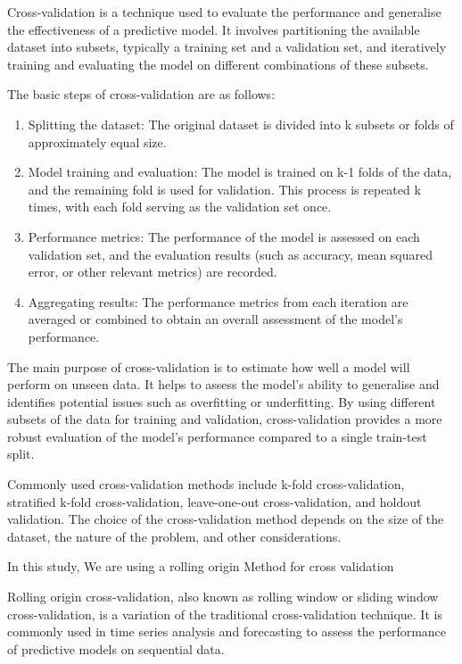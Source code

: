 \documentclass[
]{article}
\begin{document}
Cross-validation is a technique used to evaluate the performance and
generalise the effectiveness of a predictive model. It involves
partitioning the available dataset into subsets, typically a training
set and a validation set, and iteratively training and evaluating the
model on different combinations of these subsets.~

The basic steps of cross-validation are as follows:~

\begin{enumerate}
\def\labelenumi{\arabic{enumi}.}
\item
  Splitting the dataset: The original dataset is divided into k subsets
  or folds of approximately equal size.~
\item
  Model training and evaluation: The model is trained on k-1 folds of
  the data, and the remaining fold is used for validation. This process
  is repeated k times, with each fold serving as the validation set
  once.~
\item
  Performance metrics: The performance of the model is assessed on each
  validation set, and the evaluation results (such as accuracy, mean
  squared error, or other relevant metrics) are recorded.~
\item
  Aggregating results: The performance metrics from each iteration are
  averaged or combined to obtain an overall assessment of the model's
  performance.~
\end{enumerate}

The main purpose of cross-validation is to estimate how well a model
will perform on unseen data. It helps to assess the model's ability to
generalise and identifies potential issues such as overfitting or
underfitting. By using different subsets of the data for training and
validation, cross-validation provides a more robust evaluation of the
model's performance compared to a single train-test split.~

Commonly used cross-validation methods include k-fold cross-validation,
stratified k-fold cross-validation, leave-one-out cross-validation, and
holdout validation. The choice of the cross-validation method depends on
the size of the dataset, the nature of the problem, and other
considerations.

In this study, We are using a rolling origin Method for cross validation

Rolling origin cross-validation, also known as rolling window or sliding
window cross-validation, is a variation of the traditional
cross-validation technique. It is commonly used in time series analysis
and forecasting to assess the performance of predictive models on
sequential data.~
\end{document}
